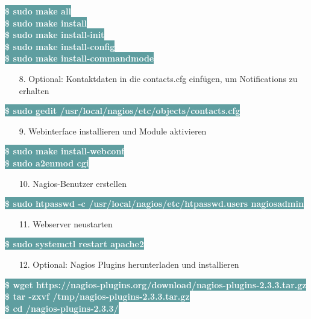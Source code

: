 \documentclass[fontsize=12pt,paper=a4,open=any,parskip=half,
  twoside=false,toc=listof,toc=bibliography,fleqn,leqno,
  captions=nooneline,captions=tableabove,british]{scrbook}
\begin{document}
\colorbox{CadetBlue}{\textcolor{white}{\textbf{\textsf{\$ sudo make all}}}}\\
\colorbox{CadetBlue}{\textcolor{white}{\textbf{\textsf{\$ sudo make install}}}}\\
\colorbox{CadetBlue}{\textcolor{white}{\textbf{\textsf{\$ sudo make install-init}}}}\\
\colorbox{CadetBlue}{\textcolor{white}{\textbf{\textsf{\$ sudo make install-config}}}}\\
\colorbox{CadetBlue}{\textcolor{white}{\textbf{\textsf{\$ sudo make install-commandmode}}}}
\begin{itemize}
\item[8.] Optional: Kontaktdaten in die contacts.cfg einfügen, um Notifications zu erhalten
\end{itemize}
\colorbox{CadetBlue}{\textcolor{white}{\textbf{\textsf{\$ sudo gedit /usr/local/nagios/etc/objects/contacts.cfg}}}}
\begin{itemize}
\item[9.] Webinterface installieren und Module aktivieren
\end{itemize}
\colorbox{CadetBlue}{\textcolor{white}{\textbf{\textsf{\$ sudo make install-webconf}}}}\\
\colorbox{CadetBlue}{\textcolor{white}{\textbf{\textsf{\$ sudo a2enmod cgi}}}}
\begin{itemize}
\item[10.] Nagios-Benutzer erstellen
\end{itemize}
\colorbox{CadetBlue}{\textcolor{white}{\textbf{\textsf{\$ sudo htpasswd -c /usr/local/nagios/etc/htpasswd.users nagiosadmin}}}}
\begin{itemize}
\item[11.] Webserver neustarten
\end{itemize}
\colorbox{CadetBlue}{\textcolor{white}{\textbf{\textsf{\$ sudo systemctl restart apache2}}}}
\begin{itemize}
\item[12.] Optional: Nagios Plugins herunterladen und installieren
\end{itemize}
\colorbox{CadetBlue}{\textcolor{white}{\textbf{\textsf{\$ wget https://nagios-plugins.org/download/nagios-plugins-2.3.3.tar.gz}}}}\\
\colorbox{CadetBlue}{\textcolor{white}{\textbf{\textsf{\$ tar -zxvf /tmp/nagios-plugins-2.3.3.tar.gz}}}}\\
\colorbox{CadetBlue}{\textcolor{white}{\textbf{\textsf{\$ cd /nagios-plugins-2.3.3/}}}}\\
\end{document}
